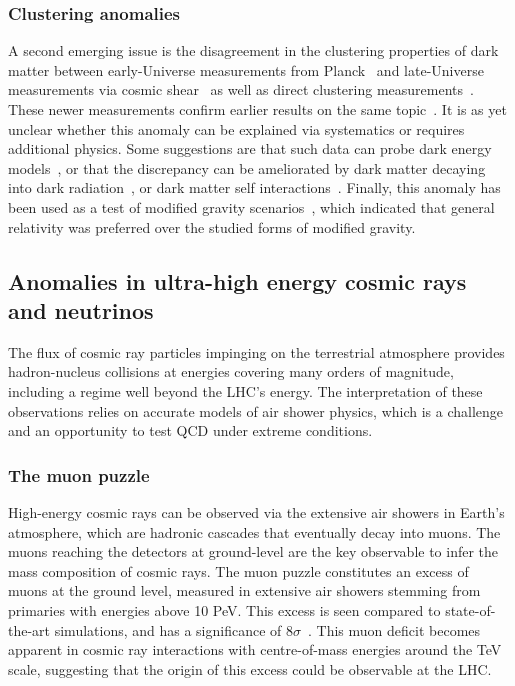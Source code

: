 \documentclass[10pt]{article}
\begin{document}
\subsubsection{Clustering anomalies}
%
A second emerging issue is the disagreement in the clustering properties of dark matter between early-Universe measurements from Planck~\cite{Planck:2018vyg} and late-Universe measurements via cosmic shear~\cite{DES:2021bvc} as well as direct clustering measurements~\cite{DES:2021zxv}. These newer measurements confirm earlier results on the same topic~\cite{Lange:2020mnl,Leauthaud:2016jdb}. It is as yet unclear whether this anomaly can be explained via systematics or requires additional physics. Some suggestions are that such data can probe dark energy models~\cite{Huterer:2017buf}, or that the discrepancy can be ameliorated by dark matter decaying into dark radiation~\cite{DES:2020mpv}, or dark matter self interactions~\cite{Buckley:2017ijx}. Finally, this anomaly has been used as a test of modified gravity scenarios~\cite{Chen:2019ftv}, which indicated that general relativity was preferred over the studied forms of modified gravity.


\subsection{Anomalies in ultra-high energy cosmic rays and neutrinos}
\label{sec:cosmics}
%
The flux of cosmic ray particles impinging on the terrestrial atmosphere provides hadron-nucleus collisions at energies covering many orders of magnitude, including a regime well beyond the LHC's energy.
The interpretation of these observations relies on accurate models of air shower
physics, which is a challenge and an opportunity to test QCD under extreme conditions.


\subsubsection{The muon puzzle}
%
High-energy cosmic rays can be observed via the extensive air showers in Earth’s atmosphere, which are hadronic cascades that eventually decay into muons.
The muons reaching the detectors at ground-level are the key observable to infer the
mass composition of cosmic rays.
The muon puzzle constitutes an excess of muons at the ground level, measured in extensive air showers stemming from primaries with energies above 10 PeV.
This excess is seen compared to state-of-the-art simulations, and has a significance of $8\sigma$~\cite{Albrecht:2021yla}.
This muon deficit becomes apparent in cosmic ray interactions with centre-of-mass energies around the TeV scale, suggesting that the origin of this excess could be observable at the LHC.
\end{document}
